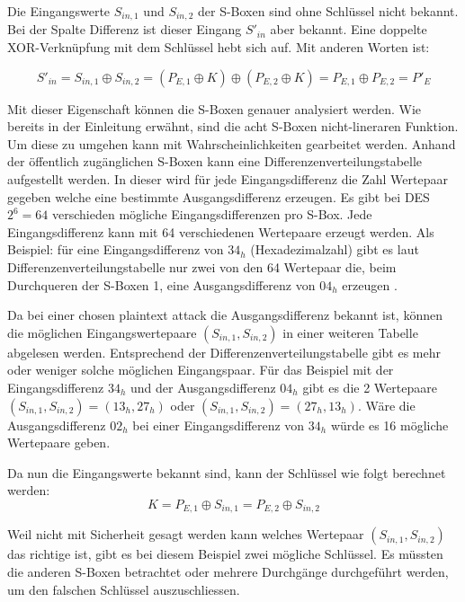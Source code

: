 Die Eingangswerte $S_{in,1}$ und $S_{in,2}$ der S-Boxen sind ohne Schlüssel nicht bekannt. Bei der Spalte \glqq Differenz\grqq{} ist dieser Eingang $S'_{in}$ aber bekannt. Eine doppelte XOR-Verknüpfung mit dem Schlüssel hebt sich auf. Mit anderen Worten ist: 

\begin{equation}\label{equ:Schluessel_Differenz}
S'_{in} = S_{in,1} \oplus S_{in,2} = (P_{E,1} \oplus K) \oplus (P_{E,2} \oplus K) = P_{E,1} \oplus P_{E,2} = P'_{E} 
\end{equation}


Mit dieser Eigenschaft können die S-Boxen genauer analysiert werden. 
Wie bereits in der Einleitung erwähnt, sind die acht S-Boxen nicht-lineraren Funktion. Um diese zu umgehen kann mit Wahrscheinlichkeiten gearbeitet werden.
Anhand der öffentlich zugänglichen S-Boxen kann eine Differenzenverteilungstabelle aufgestellt werden. In dieser wird für jede Eingangsdifferenz die Zahl Wertepaar gegeben welche eine bestimmte Ausgangsdifferenz erzeugen. 
Es gibt bei DES $2^{6} = 64$ verschieden mögliche Eingangsdifferenzen pro S-Box. Jede Eingangsdifferenz kann mit 64 verschiedenen Wertepaare erzeugt werden. Als Beispiel: für eine Eingangsdifferenz von $34_{h}$ (Hexadezimalzahl) gibt es laut Differenzenverteilungstabelle nur zwei von den 64 Wertepaar die, beim Durchqueren der S-Boxen 1, eine Ausgangsdifferenz von $04_{h}$ erzeugen \cite{noauthor_differenzielle_2019}\cite{biham_differential_1990}. 

Da bei einer chosen plaintext attack die Ausgangsdifferenz bekannt ist, können die möglichen Eingangswertepaare $(S_{in,1}, S_{in,2})$ in einer weiteren Tabelle abgelesen werden. Entsprechend der Differenzenverteilungstabelle gibt es mehr oder weniger solche möglichen Eingangspaar.
Für das Beispiel mit der Eingangsdifferenz $34_{h}$ und der Ausgangsdifferenz $04_{h}$ gibt es die 2 Wertepaare $(S_{in,1}, S_{in,2}) = (13_{h}, 27_{h})$ oder $(S_{in,1},S_{in,2}) = (27_{h}, 13_{h})$. Wäre die Ausgangsdifferenz $02_{h}$ bei einer Eingangsdifferenz von $34_{h}$ würde es 16 mögliche Wertepaare geben. 

Da nun die Eingangswerte bekannt sind, kann der Schlüssel wie folgt berechnet werden:
\begin{equation}\label{equ:Schluessel_Loesung}
K = P_{E,1} \oplus S_{in,1} = P_{E,2} \oplus S_{in,2}
\end{equation}

Weil nicht mit Sicherheit gesagt werden kann welches Wertepaar $(S_{in,1}, S_{in,2})$ das richtige ist, gibt es bei diesem Beispiel zwei mögliche Schlüssel. Es müssten die anderen S-Boxen betrachtet oder mehrere Durchgänge durchgeführt werden, um den falschen Schlüssel auszuschliessen. 

